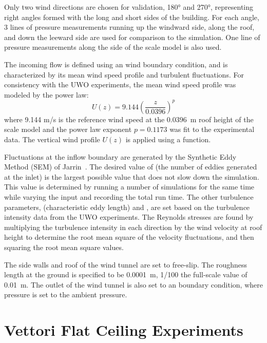 Only two wind directions are chosen for validation, 180\unit{\degree} and 270\unit{\degree}, representing right angles formed with the long and short sides of the building. For each angle, 3 lines of pressure measurements running up the windward side, along the roof, and down the leeward side are used for comparison to the simulation. One line of pressure measurements along the side of the scale model is also used.

The incoming flow is defined using an  wind boundary condition, and is characterized by its mean wind speed profile and turbulent fluctuations. For consistency with the UWO experiments, the mean wind speed profile was modeled by the power law:
\begin{equation}
U(z) = 9.144 \left(\frac{z}{0.0396}\right)^p
\end{equation}
where 9.144 m/s is the reference wind speed at the 0.0396~m roof height of the scale model and the power law exponent $p=0.1173$ was fit to the experimental data. The vertical wind profile $U(z)$ is applied using a  function.

Fluctuations at the inflow boundary are generated by the Synthetic Eddy Method (SEM) of Jarrin~\cite{Jarrin:2008}. The desired value of  (the number of eddies generated at the inlet) is the largest possible value that does not slow down the simulation. This value is determined by running a number of simulations for the same time while varying the  input and recording the total run time. The other turbulence parameters,  (characteristic eddy length) and , are set based on the turbulence intensity data from the UWO experiments. The Reynolds stresses are found by multiplying the turbulence intensity in each direction by the wind velocity at roof height to determine the root mean square of the velocity fluctuations, and then squaring the root mean square values.

The side walls and roof of the wind tunnel are set to free-slip. The roughness length at the ground is specified to be 0.0001~m, 1/100 the full-scale value of 0.01~m. The outlet of the wind tunnel is also set to an  boundary condition, where pressure is set to the ambient pressure.


\section{Vettori Flat Ceiling Experiments}
\label{Vettori_Flat_Ceiling_Description}

